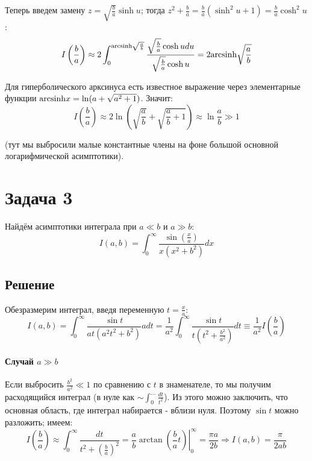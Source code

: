 \documentclass[a4paper,12pt]{article}
\begin{document}
\noindent
Теперь введем замену $z=\sqrt{\frac{b}{a}}\sinh u$; тогда $z^{2}+\frac{b}{a}=\frac{b}{a}\left(\sinh^{2}u+1\right)=\frac{b}{a}\cosh^{2}u$:
\[
I\left(\frac{b}{a}\right)\approx2\int_{0}^{{\rm arcsinh}\sqrt{\frac{a}{b}}}\frac{\sqrt{\frac{b}{a}}\cosh udu}{\sqrt{\frac{b}{a}}\cosh u}=2{\rm arcsinh}\sqrt{\frac{a}{b}}
\]

\noindent
Для гиперболического арксинуса есть известное выражение через элементарные функции ${\rm arcsinh}x = \ln(a + \sqrt{a^2+1})$. Значит:
\[
I\left(\frac{b}{a}\right)\approx2\ln\left(\sqrt{\frac{a}{b}}+\sqrt{\frac{a}{b}+1}\right)\approx\ln\frac{a}{b}\gg1
\]

\noindent
(тут мы выбросили малые константные члены на фоне большой основной логарифмической асимптотики).


\section{Задача 3}

Найдём асимптотики интеграла при $a\ll b$ и $a\gg b$:
\[
I\left(a,b\right)=\int_{0}^{\infty}\frac{\sin(\frac{x}{a})}{x(x^{2}+b^{2})}dx
\]



\subsection{Решение}

Обезразмерим интеграл, введя переменную $t=\frac{x}{a}$:
\[
I\left(a,b\right)=\int_{0}^{\infty}\frac{\sin t}{at(a^{2}t^{2}+b^{2})}adt=\frac{1}{a^{2}}\int_{0}^{\infty}\frac{\sin t}{t\left(t^{2}+\frac{b^{2}}{a^{2}}\right)}dt\equiv\frac{1}{a^{2}}I\left(\frac{b}{a}\right)
\]



\paragraph{Случай $a\gg b$}

Если выбросить $\frac{b^{2}}{a^{2}}\ll1$ по сравнению с $t$ в знаменателе,
то мы получим расходящийся интеграл (в нуле как $\sim\int_{0}^{\dots}\frac{dt}{t^{2}}$).
Из этого можно заключить, что основная область, где интеграл набирается
- вблизи нуля. Поэтому $\sin t$ можно разложить; имеем:
\[
I\left(\frac{b}{a}\right)\approx\int_{0}^{\infty}\frac{dt}{t^{2}+\left(\frac{b}{a}\right)^{2}}=\frac{a}{b}\left.\arctan\left(\frac{b}{a}t\right)\right|_{0}^{\infty}=\frac{\pi a}{2b}\Rightarrow I(a,b) = \frac{\pi}{2 a b}
\]
\end{document}
